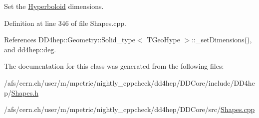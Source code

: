 Set the \hyperlink{class_d_d4hep_1_1_geometry_1_1_hyperboloid}{Hyperboloid} dimensions. 

Definition at line 346 of file Shapes.cpp.

References DD4hep::Geometry::Solid\_\-type$<$ TGeoHype $>$::\_\-setDimensions(), and dd4hep::deg.

The documentation for this class was generated from the following files:\begin{DoxyCompactItemize}
\item 
/afs/cern.ch/user/m/mpetric/nightly\_\-cppcheck/dd4hep/DDCore/include/DD4hep/\hyperlink{_shapes_8h}{Shapes.h}\item 
/afs/cern.ch/user/m/mpetric/nightly\_\-cppcheck/dd4hep/DDCore/src/\hyperlink{_shapes_8cpp}{Shapes.cpp}\end{DoxyCompactItemize}
